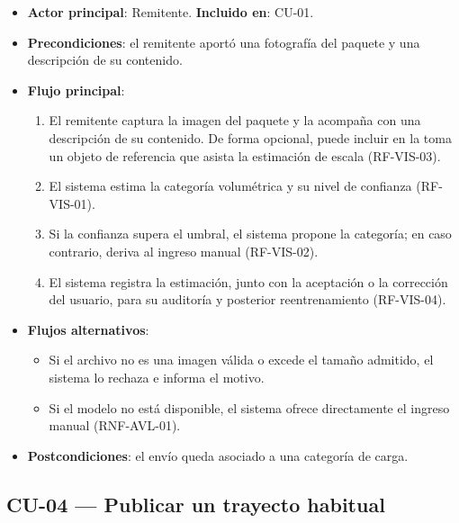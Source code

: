 {\begin{itemize}[leftmargin=2em]
    \item \textbf{Actor principal}: Remitente. \quad \textbf{Incluido en}: CU-01.
    \item \textbf{Precondiciones}: el remitente aportó una fotografía del paquete y una descripción de su contenido.
    \item \textbf{Flujo principal}:
    \begin{enumerate}[leftmargin=2em]
        \item El remitente captura la imagen del paquete y la acompaña con una descripción de su contenido. De forma opcional, puede incluir en la toma un objeto de referencia que asista la estimación de escala (RF-VIS-03).
        \item El sistema estima la categoría volumétrica y su nivel de confianza (RF-VIS-01).
        \item Si la confianza supera el umbral, el sistema propone la categoría; en caso contrario, deriva al ingreso manual (RF-VIS-02).
        \item El sistema registra la estimación, junto con la aceptación o la corrección del usuario, para su auditoría y posterior reentrenamiento (RF-VIS-04).
    \end{enumerate}
    \item \textbf{Flujos alternativos}:
    \begin{itemize}[leftmargin=2em]
        \item[1a.] Si el archivo no es una imagen válida o excede el tamaño admitido, el sistema lo rechaza e informa el motivo.
        \item[2a.] Si el modelo no está disponible, el sistema ofrece directamente el ingreso manual (RNF-AVL-01).
    \end{itemize}
    \item \textbf{Postcondiciones}: el envío queda asociado a una categoría de carga.
\end{itemize}

\subsection{CU-04 --- Publicar un trayecto habitual}

}
